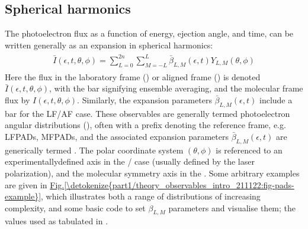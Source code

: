 \documentclass[letterpaper,table,10pt,english]{jupyterBook}
\begin{document}
\subsection{Spherical harmonics}
\label{\detokenize{part1/theory_observables_intro_211122:spherical-harmonics}}
\sphinxAtStartPar
The photoelectron flux as a function of energy, ejection angle, and time, can be written generally as an expansion in spherical harmonics:
\begin{equation}\label{equation:part1/theory_observables_intro_211122:eq:AF-PAD-general}
\begin{split}
\begin{align}
\bar{I}(\epsilon,t,\theta,\phi)=\sum_{L=0}^{2n}\sum_{M=-L}^{L}\bar{\beta}_{L,M}(\epsilon,t)Y_{L,M}(\theta,\phi)
\end{align}
\end{split}
\end{equation}
\sphinxAtStartPar
Here the flux in the laboratory frame ({\hyperref[\detokenize{backmatter/glossary:term-LF}]{}}) or aligned frame ({\hyperref[\detokenize{backmatter/glossary:term-AF}]{}}) is denoted \(\bar{I}(\epsilon,t,\theta,\phi)\), with the bar signifying ensemble averaging, and the molecular frame flux by \(I(\epsilon,t,\theta,\phi)\). Similarly, the expansion parameters \(\bar{\beta}_{L,M}(\epsilon,t)\) include a bar for the LF/AF case. These observables are generally termed photoelectron angular distributions ({\hyperref[\detokenize{backmatter/glossary:term-PADs}]{}}), often with a prefix denoting the reference frame, e.g. LFPADs, MFPADs, and the associated expansion parameters \(\bar{\beta}_{L,M}(\epsilon,t)\) are generically termed {\hyperref[\detokenize{backmatter/glossary:term-anisotropy-paramters}]{}}. The polar coordinate system \((\theta,\phi)\) is referenced to
an experimentally\sphinxhyphen{}defined axis in the {\hyperref[\detokenize{backmatter/glossary:term-LF}]{}}/{\hyperref[\detokenize{backmatter/glossary:term-AF}]{}} case (usually defined by the laser polarization), and the molecular symmetry axis in the {\hyperref[\detokenize{backmatter/glossary:term-MF}]{}}. Some arbitrary examples are given in \hyperref[\detokenize{part1/theory_observables_intro_211122:fig-pads-example}]{Fig.\@ \ref{\detokenize{part1/theory_observables_intro_211122:fig-pads-example}}}, which illustrates both a range of distributions of increasing complexity, and some basic code to set \(\beta_{L,M}\) parameters and visualise them; the values used as tabulated in  .
\end{document}
